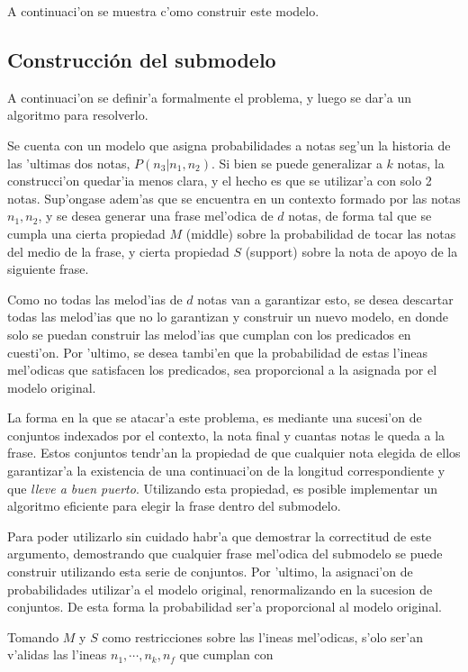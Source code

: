 A continuaci'on se muestra c'omo construir este modelo. 


\subsection{Construcci\'on del submodelo}
\label{sec:phrase_model}
A continuaci'on se definir'a formalmente el problema, y luego se dar'a un algoritmo para resolverlo.

Se cuenta con un modelo que asigna probabilidades a notas seg'un la historia de las 'ultimas dos notas, $P(n_3 | n_1, n_2)$. Si bien se puede generalizar a $k$ notas,
la construcci'on quedar'ia menos clara, y el hecho es que se utilizar'a con solo 2 notas. Sup'ongase adem'as que se encuentra en un contexto formado por las notas 
$n_1, n_2$, y se desea generar una frase mel'odica de $d$ notas, de forma tal que se cumpla una cierta propiedad $M$ (middle) sobre la probabilidad de tocar las notas
del medio de la frase, y cierta propiedad $S$ (support) sobre la nota de apoyo de la siguiente frase.

Como no todas las melod'ias de $d$ notas van a garantizar esto, se desea descartar todas las melod'ias que no lo garantizan y construir un nuevo modelo, en donde
solo se puedan construir las melod'ias que cumplan con los predicados en cuesti'on. Por 'ultimo, se desea tambi'en que la probabilidad de estas l'ineas mel'odicas 
que satisfacen los predicados, sea proporcional a la asignada por el modelo original. 

La forma en la que se atacar'a este problema, es mediante una sucesi'on de conjuntos indexados por el contexto, la nota final y cuantas notas le queda
a la frase. Estos conjuntos tendr'an la propiedad de que cualquier nota elegida de ellos garantizar'a la existencia de una continuaci'on de la longitud correspondiente 
 y que \emph{lleve a buen puerto}. Utilizando esta propiedad, es posible implementar un algoritmo eficiente para elegir la frase dentro del submodelo. 

Para poder utilizarlo sin cuidado habr'a que demostrar la correctitud de este argumento, demostrando que cualquier frase mel'odica del submodelo se puede construir
utilizando esta serie de conjuntos. Por 'ultimo, la asignaci'on de probabilidades utilizar'a el modelo original, renormalizando en la sucesion de conjuntos. De esta 
forma la probabilidad ser'a proporcional al modelo original.

Tomando $M$ y $S$ como restricciones sobre las l'ineas mel'odicas, s'olo ser'an v'alidas las l'ineas $n_1, \cdots, n_k, n_f$ que cumplan con

